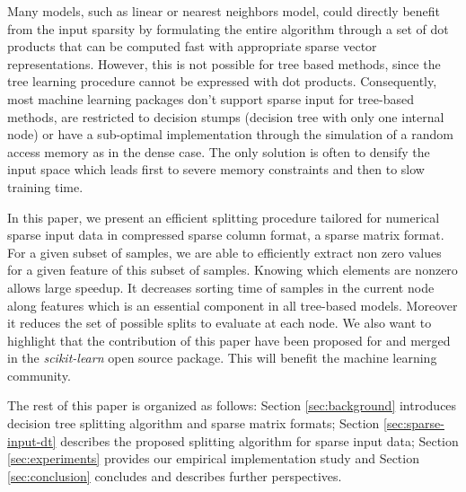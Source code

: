 Many models, such as linear or nearest neighbors model, could directly
benefit from the input sparsity by formulating the entire algorithm
through a set of dot products that can be computed fast with
appropriate sparse vector representations. However, this is not
possible for tree based methods, since the tree learning procedure
cannot be expressed with dot products. Consequently, most machine
learning packages don't support sparse input for tree-based methods,
are restricted to decision stumps (decision tree with only one
internal node) or have a sub-optimal implementation through the
simulation of a random access memory as in the dense case. The only
solution is often to densify the input space which leads first to
severe memory constraints and then to slow training time.

In this paper, we present an efficient splitting procedure tailored for
numerical sparse input data in compressed sparse column format, a sparse matrix
format. For a given subset of samples, we are able to efficiently extract non
zero values for a given feature of this subset of samples. Knowing which
elements are nonzero allows large speedup. It decreases sorting time of
samples in the current node along features which is an essential component in
all tree-based models. Moreover it reduces the set of possible splits to
evaluate at each node. We also want to highlight that the contribution of this
paper have been proposed for and merged in the  \emph{scikit-learn}
\cite{buitinck2013api,pedregosa2011scikit} open source package. This will
benefit the machine learning community.

The rest of this paper is organized as follows: Section \ref{sec:background}
introduces decision tree splitting algorithm and sparse matrix formats; Section
\ref{sec:sparse-input-dt} describes the proposed splitting algorithm for sparse
input data; Section \ref{sec:experiments} provides our empirical implementation
study and Section \ref{sec:conclusion} concludes and describes further
perspectives.

